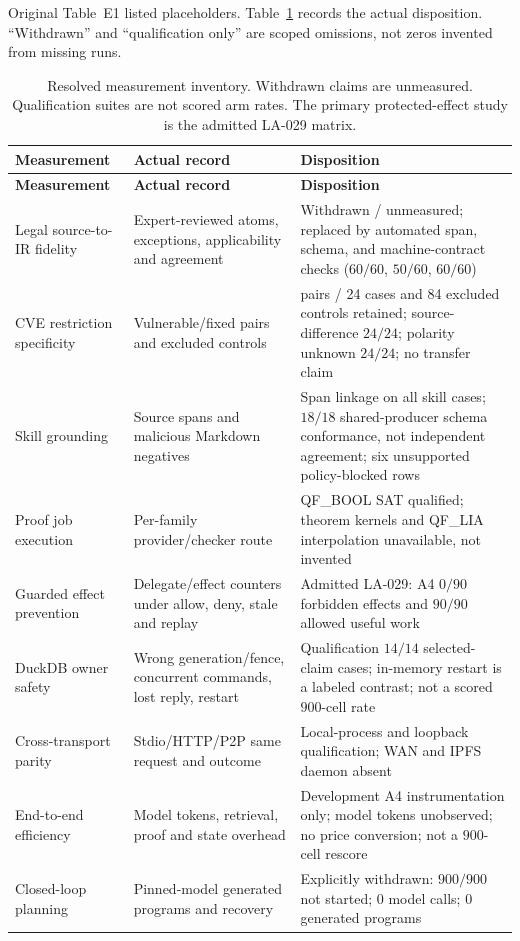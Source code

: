 \documentclass{article}
\begin{document}
Original Table~E1 listed placeholders. Table~\ref{tab:E1} records the actual disposition. ``Withdrawn'' and ``qualification only'' are scoped omissions, not zeros invented from missing runs.
\begingroup
\renewcommand{\thetable}{E1}
\begin{longtable}{@{}>{\raggedright\arraybackslash}p{.24\linewidth} >{\raggedright\arraybackslash}p{.32\linewidth} >{\raggedright\arraybackslash}p{.38\linewidth}@{}}
\caption{Resolved measurement inventory. Withdrawn claims are unmeasured. Qualification suites are not scored arm rates. The primary protected-effect study is the admitted LA-029 matrix.}\label{tab:E1}\\
\toprule
\textbf{Measurement} & \textbf{Actual record} & \textbf{Disposition} \\
\midrule
\endfirsthead
\textbf{Measurement} & \textbf{Actual record} & \textbf{Disposition} \\
\midrule
\endhead
\bottomrule
\endlastfoot
Legal source-to-IR fidelity & Expert-reviewed atoms, exceptions, applicability and agreement & Withdrawn / unmeasured; replaced by automated span, schema, and machine-contract checks ($60/60$, $50/60$, $60/60$) \\[3pt]
CVE restriction specificity & Vulnerable/fixed pairs and excluded controls & 12 pairs / 24 cases and 84 excluded controls retained; source-difference $24/24$; polarity unknown $24/24$; no transfer claim \\[3pt]
Skill grounding & Source spans and malicious Markdown negatives & Span linkage on all skill cases; $18/18$ shared-producer schema conformance, not independent agreement; six unsupported policy-blocked rows \\[3pt]
Proof job execution & Per-family provider/checker route & QF\_BOOL SAT qualified; theorem kernels and QF\_LIA interpolation unavailable, not invented \\[3pt]
Guarded effect prevention & Delegate/effect counters under allow, deny, stale and replay & Admitted LA-029: A4 $0/90$ forbidden effects and $90/90$ allowed useful work \\[3pt]
DuckDB owner safety & Wrong generation/fence, concurrent commands, lost reply, restart & Qualification $14/14$ selected-claim cases; in-memory restart is a labeled contrast; not a scored $900$-cell rate \\[3pt]
Cross-transport parity & Stdio/HTTP/P2P same request and outcome & Local-process and loopback qualification; WAN and IPFS daemon absent \\[3pt]
End-to-end efficiency & Model tokens, retrieval, proof and state overhead & Development A4 instrumentation only; model tokens unobserved; no price conversion; not a $900$-cell rescore \\[3pt]
Closed-loop planning & Pinned-model generated programs and recovery & Explicitly withdrawn: $900/900$ not started; $0$ model calls; $0$ generated programs \\[3pt]
\end{longtable}
\endgroup
\end{document}
